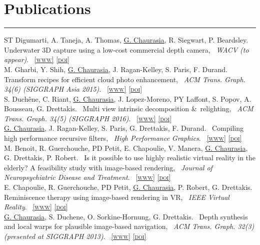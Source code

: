 \documentclass[10pt]{article}
\newcommand{\amper}{{\scshape\&}~}
\newcommand{\notes}[1]{\marginnote{\color{Gray}\small #1}}
\newcommand{\customsection}[1]{\section*{#1}\vspace{-0.2cm}\hrule\vspace{0.1cm}}
\newcommand{\emphasize}[1]{\underline{#1}}
\newcommand{\paper}[1]{{#1,~}}
\newcommand{\authors}[1]{{#1.~}}
\newcommand{\journal}[1]{{\itshape #1}.~}
\newcommand{\link}[2]{\href{#1}{{#2}}}                        %
\newcommand{\html}[1]{\link{#1}{{\scriptsize\scshape[www]}}}
\newcommand{\doi}[1]{\link{#1}{{\scriptsize\scshape[doi]}}}
\begin{document}
\customsection{Publications}
\notes{2016}
\authors{ST Digumarti, A. Taneja, A. Thomas, \emphasize{G. Chaurasia}, R. Siegwart, P. Beardsley}
\paper{Underwater 3D capture using a low-cost commercial depth camera}
\journal{WACV (to appear)}
\html{}
\doi{}
\\[0.18cm]
%
\notes{2015}
\authors{M. Gharbi, Y. Shih, \emphasize{G. Chaurasia}, J. Ragan-Kelley, S. Paris, F. Durand}
\paper{Transform recipes for efficient cloud photo enhancement}
\journal{ACM Trans. Graph. 34(6) (SIGGRAPH Asia 2015)}
\html{http://people.csail.mit.edu/gharbi/xform_recipe/}
\doi{http://dx.doi.org/10.1145/2816795.2818127}
\\[0.18cm]
%
\notes{2015}
\authors{S. Duch\^{e}ne, C. Riant, \emphasize{G. Chaurasia}, J. Lopez-Moreno, PY Laffont, S. Popov, A. Bousseau, G. Drettakis}
\paper{Multi view intrinsic decomposition \amper relighting}
\journal{ACM Trans. Graph. 34(5) (SIGGRAPH 2016)}
\html{http://www-sop.inria.fr/reves/Basilic/2015/DRCLLPD15/}
\doi{http://dx.doi.org/10.1145/2790060.2790063}
\\[0.18cm]
%
\notes{2015}
\authors{\emphasize{G. Chaurasia}, J. Ragan-Kelley, S. Paris, G. Drettakis, F. Durand}
\paper{Compiling high performance recursive filters}
\journal{High Performance Graphics}
\html{https://mit-gfx.github.io/recfilter/}
\doi{http://dx.doi.org/10.1145/2790060.2790063}
\\[0.18cm]
%
\notes{2015}
\authors{M. Benoit, R. Guerchouche, PD Petit, E. Chapoulie, V. Manera, \emphasize{G. Chaurasia}, G. Drettakis, P. Robert}
\paper{Is it possible to use highly realistic virtual reality in the elderly? A feasibility study with image-based rendering}
\journal{Journal of Neuropsychiatric Disease and Treatment}
\html{http://www.dovepress.com/articles.php?article_id=20707}
\doi{http://dx.doi.org/10.2147/NDT.S73179}\\[0.18cm]
%
\notes{2014}
\authors{E. Chapoulie, R. Guerchouche, PD Petit, \emphasize{G. Chaurasia}, P. Robert, G. Drettakis}
\paper{Reminiscence therapy using image-based rendering in VR}
\journal{IEEE Virtual Reality}
\html{http://www-sop.inria.fr/reves/Basilic/2014/CGPCRD14/}
\doi{http://dx.doi.org/10.1109/VR.2014.6802049}\\[0.18cm]
%
\notes{2013}
\authors{\emphasize{G. Chaurasia}, S. Duchene, O. Sorkine-Hornung, G. Drettakis}
\paper{Depth synthesis and local warps for plausible image-based navigation}
\journal{ACM Trans. Graph. 32(3) (presented at SIGGRAPH 2013)}
\html{http://www-sop.inria.fr/reves/Basilic/2013/CDSD13/}
\doi{http://dx.doi.org/10.1145/2487228.2487238}\\[0.18cm]
\end{document}
